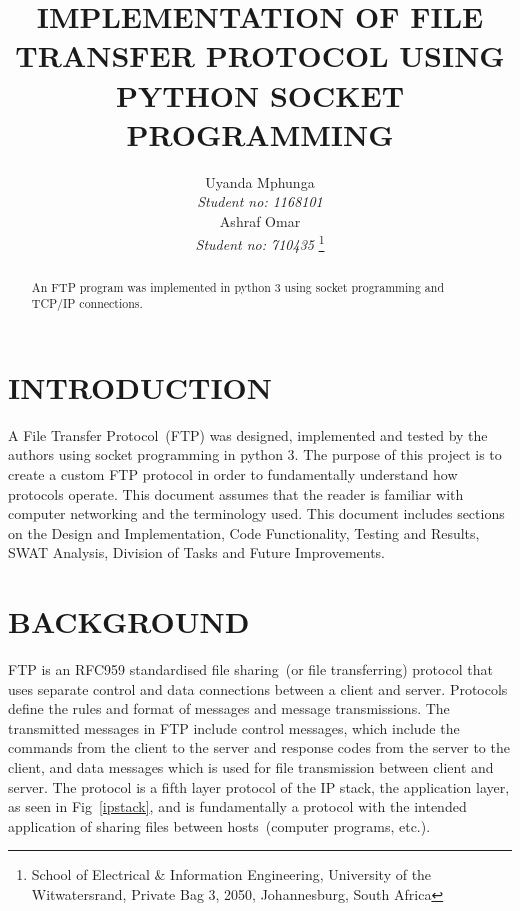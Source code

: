 \documentclass[journal, a4paper]{IEEEtran}
\begin{document}
\title{IMPLEMENTATION OF FILE TRANSFER PROTOCOL USING PYTHON SOCKET PROGRAMMING}

\author{Uyanda Mphunga \\ \textit{Student no: 1168101}\\ Ashraf Omar\\ \textit{Student no: 710435}
	\thanks{School of Electrical \& Information Engineering, University of the
		Witwatersrand, Private Bag 3, 2050, Johannesburg, South Africa}
}


%



\maketitle
\thispagestyle{empty}\pagestyle{empty}

\newlength\tindent
\setlength{\tindent}{\parindent}
\setlength{\parindent}{0pt}
\renewcommand{\indent}{\hspace*{\tindent}}

\begin{abstract}
	An FTP program was implemented in python 3 using socket programming and TCP/IP connections. 
\end{abstract}

%
\section{INTRODUCTION}
A File Transfer Protocol~(FTP) was designed, implemented and tested by the authors using socket programming in python 3. The purpose of this project is to create a custom FTP protocol in order to fundamentally understand how protocols operate. This document assumes that the reader is familiar with computer networking and the terminology used. This document includes sections on the Design and Implementation, Code Functionality, Testing and Results, SWAT Analysis, Division of Tasks and Future Improvements. 

\section{BACKGROUND}
FTP is an RFC959 \cite{rfc} standardised file sharing~(or file transferring) protocol that uses separate control and data connections between a client and server\cite{tcp}. Protocols define the rules and format of messages and message transmissions. The transmitted messages in FTP include control messages, which include the commands from the client to the server and response codes from the server to the client, and data messages which is used for file transmission between client and server. The protocol is a fifth layer protocol of the IP stack, the application layer, as seen in Fig~\ref{ipstack}, and is fundamentally a protocol with the intended application of sharing files between hosts~(computer programs, etc.). 
\end{document}

